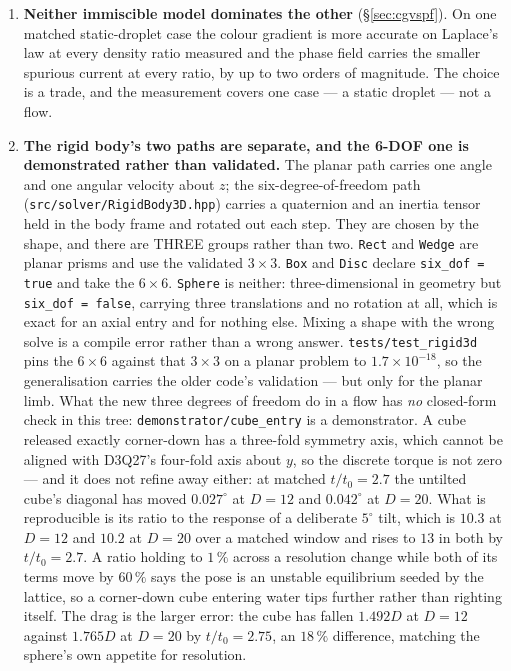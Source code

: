 \documentclass[11pt,a4paper]{article}
\newcommand{\code}[1]{\texttt{\small #1}}
\begin{document}
\begin{enumerate}[leftmargin=1.4em,itemsep=4pt]
\item \textbf{Neither immiscible model dominates the other}
  (\S\ref{sec:cgvspf}). On one matched static-droplet case the colour gradient
  is more accurate on Laplace's law at every density ratio measured and the
  phase field carries the smaller spurious current at every ratio, by up to two
  orders of magnitude. The choice is a trade, and the measurement covers one
  case --- a static droplet --- not a flow.

\item \textbf{The rigid body's two paths are separate, and the 6-DOF one is
  demonstrated rather than validated.} The planar path carries one angle and one
  angular velocity about $z$; the six-degree-of-freedom path
  (\code{src/solver/RigidBody3D.hpp}) carries a quaternion and an inertia tensor
  held in the body frame and rotated out each step. They are chosen by the
  shape, and there are THREE groups rather than two. \code{Rect} and \code{Wedge}
  are planar prisms and use the validated $3\times3$. \code{Box} and \code{Disc}
  declare \code{six\_dof = true} and take the $6\times6$. \code{Sphere} is neither:
  three-dimensional in geometry but \code{six\_dof = false}, carrying three
  translations and no rotation at all, which is exact for an axial entry and for
  nothing else. Mixing a shape with the wrong solve is a compile error rather than
  a wrong answer. \code{tests/test\_rigid3d} pins the $6\times6$ against that $3\times3$
  on a planar problem to $1.7\times10^{-18}$, so the generalisation carries the
  older code's validation --- but only for the planar limb. What the new three
  degrees of freedom do in a flow has \emph{no} closed-form check in this tree:
  \code{demonstrator/cube\_entry} is a demonstrator. A cube released exactly
  corner-down has a three-fold symmetry axis, which cannot be aligned with
  D3Q27's four-fold axis about $y$, so the discrete torque is not zero --- and
  it does not refine away either: at matched $t/t_0=2.7$ the untilted cube's
  diagonal has moved $0.027^\circ$ at $D=12$ and $0.042^\circ$ at $D=20$. What
  is reproducible is its ratio to the response of a deliberate $5^\circ$ tilt,
  which is $10.3$ at $D=12$ and $10.2$ at $D=20$ over a matched window and rises
  to $13$ in both by $t/t_0=2.7$. A ratio holding to $1\,\%$ across a resolution
  change while both of its terms move by $60\,\%$ says the pose is an unstable
  equilibrium seeded by the lattice, so a corner-down cube entering water tips
  further rather than righting itself. The drag is the larger error: the cube has
  fallen $1.492D$ at $D=12$ against $1.765D$ at $D=20$ by $t/t_0=2.75$, an
  $18\,\%$ difference, matching the sphere's own appetite for resolution.


\end{enumerate}
\end{document}
